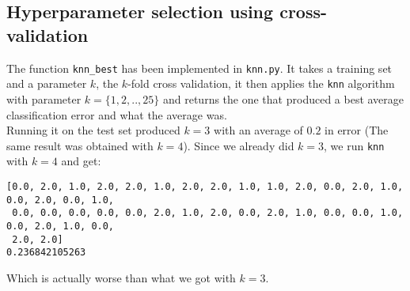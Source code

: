 \documentclass[a4paper]{article}
\begin{document}
\subsection{Hyperparameter selection using cross-validation}
The function \texttt{knn\_best} has been implemented in \texttt{knn.py}. It takes a training set and a parameter $k$, the $k$-fold cross validation, it then applies the \texttt{knn} algorithm with parameter $k=\{1,2,..,25\}$ and returns the one that produced a best average classification error and what the average was. \\
Running it on the test set produced $k=3$ with an average of $0.2$ in error (The same result was obtained with $k=4$). Since we already did $k=3$, we run \texttt{knn} with $k=4$ and get:
\begin{verbatim}
[0.0, 2.0, 1.0, 2.0, 2.0, 1.0, 2.0, 2.0, 1.0, 1.0, 2.0, 0.0, 2.0, 1.0, 0.0, 2.0, 0.0, 1.0,
 0.0, 0.0, 0.0, 0.0, 0.0, 2.0, 1.0, 2.0, 0.0, 2.0, 1.0, 0.0, 0.0, 1.0, 0.0, 2.0, 1.0, 0.0,
 2.0, 2.0]
0.236842105263
\end{verbatim}
Which is actually worse than what we got with $k=3$.
\end{document}
